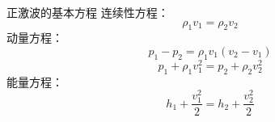 \begin{frame}{正激波的基本方程}
  连续性方程：
  \begin{equation*}
    \rho_{1}v_{1}
    =
    \rho_{2}v_{2}
  \end{equation*}
  动量方程：
  \begin{equation*}
    p_{1}-p_{2}
    =
    \rho_{1}v_{1}(v_{2}-v_{1})
  \end{equation*}
  \begin{equation*}
    p_{1}
    +
    \rho_{1}v_{1}^{2}
    =
    p_{2}
    +
    \rho_{2}v_{2}^{2}
  \end{equation*}
  能量方程：
  \begin{equation*}
    h_{1}
    +
    \frac{v_{1}^{2}}{2}
    =
    h_{2}
    +
    \frac{v_{2}^{2}}{2}
  \end{equation*}
\end{frame}

